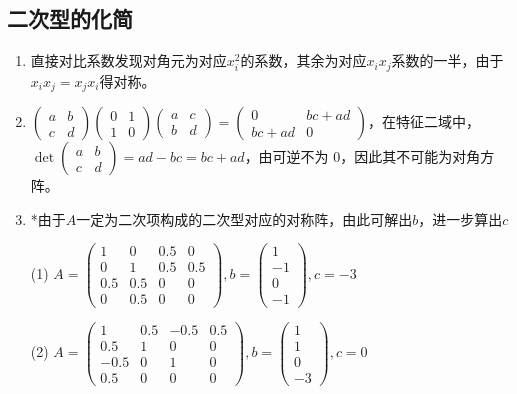 \documentclass[a4paper,UTF8,fontset=windows]{ctexart}
\begin{document}
\subsection{二次型的化简}
\begin{enumerate}
\item
直接对比系数发现对角元为对应$x_i^2$的系数，其余为对应$x_ix_j$系数的一半，由于$x_ix_j=x_jx_i$得对称。

\item
$\begin{pmatrix}a&b\\c&d\end{pmatrix}\begin{pmatrix}0&1\\1&0\end{pmatrix}\begin{pmatrix}a&c\\b&d\end{pmatrix}=\begin{pmatrix}0&bc+ad\\bc+ad&0\end{pmatrix}$，在特征二域中，$\det\begin{pmatrix}a&b\\c&d\end{pmatrix}=ad-bc=bc+ad$，由可逆不为 0，因此其不可能为对角方阵。

\item
*由于$A$一定为二次项构成的二次型对应的对称阵，由此可解出$b$，进一步算出$c$

(1) $A=\begin{pmatrix}1&0&0.5&0\\0&1&0.5&0.5\\0.5&0.5&0&0\\0&0.5&0&0\end{pmatrix},b=\begin{pmatrix}1\\-1\\0\\-1\end{pmatrix},c=-3$

(2) $A=\begin{pmatrix}1&0.5&-0.5&0.5\\0.5&1&0&0\\-0.5&0&1&0\\0.5&0&0&0\end{pmatrix},b=\begin{pmatrix}1\\1\\0\\-3\end{pmatrix},c=0$


\end{enumerate}
\end{document}
